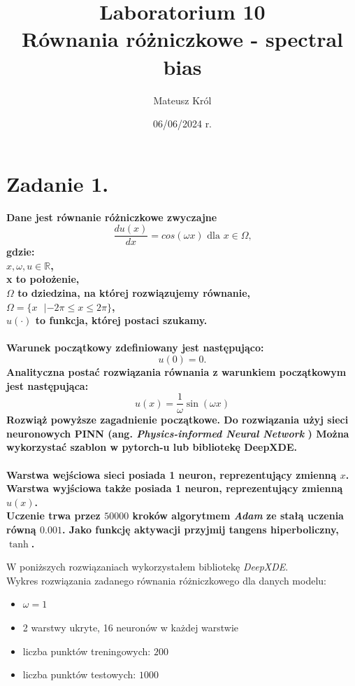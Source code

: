 \documentclass{article}
\title{%
Laboratorium 10\\
  \huge Równania różniczkowe - spectral bias}
\author{Mateusz Król}
\date{06/06/2024 r.}
\begin{document}
\maketitle

 
\section*{Zadanie 1.}
\textbf{Dane jest równanie różniczkowe zwyczajne
$$ \frac{du(x)}{dx} = cos(\omega x) \text{ dla } x \in \Omega \text{,}  $$
gdzie: \\
$x, \omega, u \in \mathbb{R}$,\\
x to położenie,\\
$\Omega$ to dziedzina, na której rozwiązujemy równanie, \\
$\Omega = \{x \text{  }| -2\pi \le x \le 2\pi\}$, \\
$u(\cdot)$ to funkcja, której postaci szukamy. \\\\
Warunek początkowy zdefiniowany jest następująco:
$$ u(0) = 0 \text{.}$$
Analityczna postać rozwiązania równania z warunkiem początkowym
jest następująca:
$$ u(x) = \frac{1}{\omega} \sin(\omega x) $$
Rozwiąż powyższe zagadnienie początkowe. Do rozwiązania użyj sieci neuronowych
PINN (ang. \textit{Physics-informed Neural Network} )
Można wykorzystać szablon w pytorch-u lub bibliotekę DeepXDE.\\\\
Warstwa wejściowa sieci posiada 1 neuron, reprezentujący zmienną $x$.\\
Warstwa wyjściowa także posiada 1 neuron, reprezentujący zmienną $\hat{u}(x)$.\\
Uczenie trwa przez $50 000$ kroków algorytmem \textit{Adam} ze stałą uczenia równą $0.001$.
Jako funkcję aktywacji przyjmij tangens hiperboliczny, $\tanh$.
}
\newpage

W poniższych rozwiązaniach wykorzystałem bibliotekę \textit{DeepXDE}.\\

Wykres rozwiązania zadanego równania różniczkowego dla danych modelu:\\
\begin{itemize}
  \item $\omega = 1$\\
  \item 2 warstwy ukryte, 16 neuronów w każdej warstwie\\
  \item liczba punktów treningowych: $200$\\
  \item liczba punktów testowych: $1000$
\end{itemize}
\end{document}
